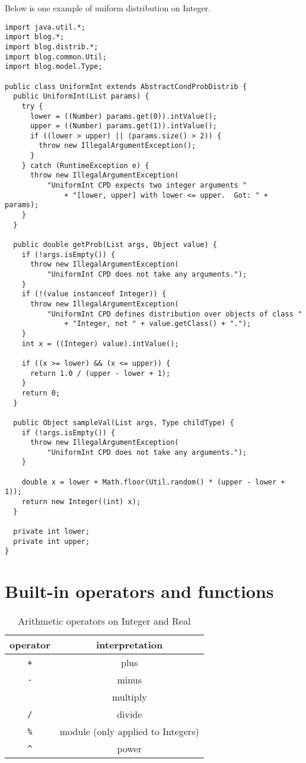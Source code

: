 \documentclass[12pt]{article}
\begin{document}
Below is one example of uniform distribution on Integer.

\begin{verbatim}
import java.util.*;
import blog.*;
import blog.distrib.*;
import blog.common.Util;
import blog.model.Type;

public class UniformInt extends AbstractCondProbDistrib {
  public UniformInt(List params) {
    try {
      lower = ((Number) params.get(0)).intValue();
      upper = ((Number) params.get(1)).intValue();
      if ((lower > upper) || (params.size() > 2)) {
        throw new IllegalArgumentException();
      }
    } catch (RuntimeException e) {
      throw new IllegalArgumentException(
          "UniformInt CPD expects two integer arguments "
              + "[lower, upper] with lower <= upper.  Got: " + params);
    }
  }

  public double getProb(List args, Object value) {
    if (!args.isEmpty()) {
      throw new IllegalArgumentException(
          "UniformInt CPD does not take any arguments.");
    }
    if (!(value instanceof Integer)) {
      throw new IllegalArgumentException(
          "UniformInt CPD defines distribution over objects of class "
              + "Integer, not " + value.getClass() + ".");
    }
    int x = ((Integer) value).intValue();

    if ((x >= lower) && (x <= upper)) {
      return 1.0 / (upper - lower + 1);
    }
    return 0;
  }

  public Object sampleVal(List args, Type childType) {
    if (!args.isEmpty()) {
      throw new IllegalArgumentException(
          "UniformInt CPD does not take any arguments.");
    }

    double x = lower + Math.floor(Util.random() * (upper - lower + 1));
    return new Integer((int) x);
  }

  private int lower;
  private int upper;
}
\end{verbatim}





\appendix

\section{Built-in operators and functions}
\begin{table}[h]
\centering
\caption{Arithmetic operators on Integer and Real}
\begin{tabular}{ c c }
\toprule 
operator & interpretation \\
\midrule
{\tt +} & plus \\ 
{\tt -} & minus \\ 
{\tt *} & multiply \\
{\tt /} & divide \\ 
{\tt \%} & module (only applied to Integers) \\
\verb|^| & power \\
\bottomrule
\end{tabular}
\end{table}
\end{document}
